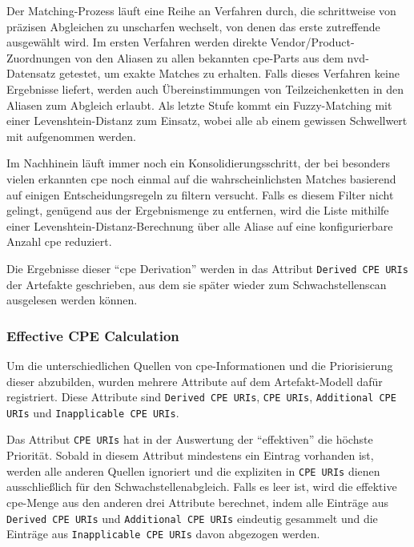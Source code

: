 Der Matching-Prozess läuft eine Reihe an Verfahren durch, die schrittweise von präzisen Abgleichen zu unscharfen wechselt, von denen das erste zutreffende ausgewählt wird.
Im ersten Verfahren werden direkte Vendor/Product-Zuordnungen von den Aliasen zu allen bekannten \acrshort{cpe}-Parts aus dem \acrshort{nvd}-Datensatz getestet, um exakte Matches zu erhalten.
Falls dieses Verfahren keine Ergebnisse liefert, werden auch Übereinstimmungen von Teilzeichenketten in den Aliasen zum Abgleich erlaubt.
Als letzte Stufe kommt ein Fuzzy-Matching mit einer Levenshtein-Distanz zum Einsatz, wobei alle  ab einem gewissen Schwellwert mit aufgenommen werden.

Im Nachhinein läuft immer noch ein Konsolidierungsschritt, der bei besonders vielen erkannten \acrshort{cpe} noch einmal auf die wahrscheinlichsten Matches basierend auf einigen Entscheidungsregeln zu filtern versucht.
Falls es diesem Filter nicht gelingt, genügend  aus der Ergebnismenge zu entfernen, wird die Liste mithilfe einer Levenshtein-Distanz-Berechnung über alle Aliase auf eine konfigurierbare Anzahl \acrshort{cpe} reduziert.

Die Ergebnisse dieser \enquote{\acrshort{cpe} Derivation} werden in das Attribut \texttt{Derived CPE URIs} der Artefakte geschrieben, aus dem sie später wieder zum Schwachstellenscan ausgelesen werden können.

\subsubsection{Effective CPE Calculation}\label{subsubsec:effective-cpe-calculation}

Um die unterschiedlichen Quellen von \acrshort{cpe}-Informationen und die Priorisierung dieser abzubilden, wurden mehrere Attribute auf dem Artefakt-Modell dafür registriert.
Diese Attribute sind \texttt{Derived CPE URIs}, \texttt{CPE URIs}, \texttt{Additional CPE URIs} und \texttt{Inapplicable CPE URIs}.

Das Attribut \texttt{CPE URIs} hat in der Auswertung der \enquote{effektiven}  die höchste Priorität.
Sobald in diesem Attribut mindestens ein Eintrag vorhanden ist, werden alle anderen Quellen ignoriert und die expliziten  in \texttt{CPE URIs} dienen ausschließlich für den Schwachstellenabgleich.
Falls es leer ist, wird die effektive \acrshort{cpe}-Menge aus den anderen drei Attribute berechnet, indem alle Einträge aus \texttt{Derived CPE URIs} und \texttt{Additional CPE URIs} eindeutig gesammelt und die Einträge aus \texttt{Inapplicable CPE URIs} davon abgezogen werden.

